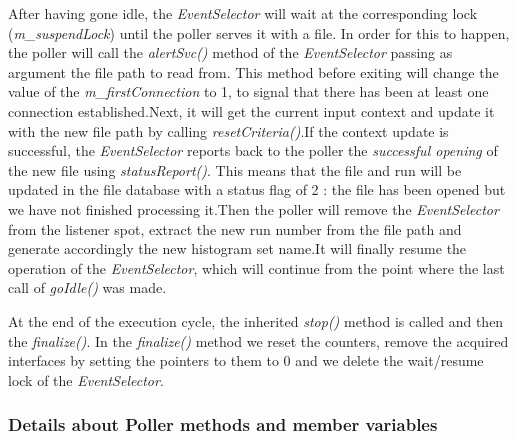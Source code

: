 After having gone idle, the \textit{EventSelector} will wait at the corresponding lock (\textit{m\_suspendLock}) until the poller serves it with a file. In order for this to happen, the poller will call the \textit{alertSvc()} method of the \textit{EventSelector} passing as argument the file path to read from. This method before exiting will change the value of the \textit{m\_firstConnection} to 1, to signal that there has been at least one connection established.Next, it will get the current input context and update it with the new file path by calling \textit{resetCriteria()}.If the context update is successful, the \textit{EventSelector} reports back to the poller the \textit{successful opening} of the new file using \textit{statusReport()}. This means that the file and run will be updated in the file database with a status flag of 2 : the file has been opened but we have not finished processing it.Then the poller will remove the \textit{EventSelector} from the listener spot, extract the new run number from the file path and generate accordingly the new histogram set name.It will finally resume the operation of the \textit{EventSelector}, which will continue from the point where the last call of \textit{goIdle()} was made.\par
At the end of the execution cycle, the inherited \textit{stop()} method is called and then the \textit{finalize()}. In the \textit{finalize()} method we reset the counters, remove the acquired interfaces by setting the pointers to them to 0 and we delete the wait/resume lock of the \textit{EventSelector}.

\subsubsection{\textbf{Details about Poller methods and member variables}}

